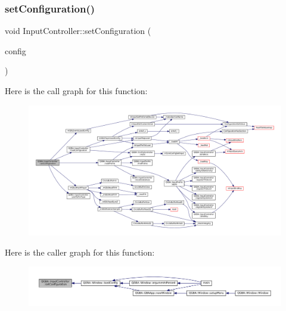 \subsubsection{\texorpdfstring{set\+Configuration()}{setConfiguration()}}
{\footnotesize\ttfamily void Input\+Controller\+::set\+Configuration (\begin{DoxyParamCaption}\item[{\mbox{\hyperlink{class_q_g_b_a_1_1_config_controller}{Config\+Controller}} $\ast$}]{config }\end{DoxyParamCaption})}

Here is the call graph for this function\+:
\nopagebreak
\begin{figure}[H]
\begin{center}
\leavevmode
\includegraphics[width=350pt]{class_q_g_b_a_1_1_input_controller_afea2c3e3f7d19b60ea6903b19b9630de_cgraph}
\end{center}
\end{figure}
Here is the caller graph for this function\+:
\nopagebreak
\begin{figure}[H]
\begin{center}
\leavevmode
\includegraphics[width=350pt]{class_q_g_b_a_1_1_input_controller_afea2c3e3f7d19b60ea6903b19b9630de_icgraph}
\end{center}
\end{figure}
\mbox{\label{class_q_g_b_a_1_1_input_controller_a6ee11725ccde4c1b61320e891a019772}} 

